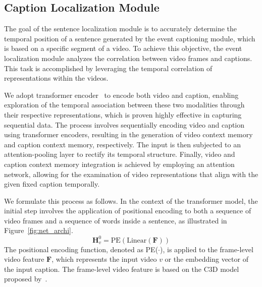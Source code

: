 \subsection{Caption Localization Module}
The goal of the sentence localization module is to accurately determine the temporal position of a sentence generated by the event captioning module, which is based on a specific segment of a video.
To achieve this objective, the event localization module analyzes the correlation between video frames and captions.
This task is accomplished by leveraging the temporal correlation of representations within the videos.

We adopt transformer encoder~\cite{Vaswani2017-sc} to encode both video and caption, enabling exploration of the temporal association between these two modalities through their respective representations, which is proven highly effective in capturing sequential data.
The process involves sequentially encoding video and caption using transformer encoders, resulting in the generation of video context memory and caption context memory, respectively.
The input is then subjected to an attention-pooling layer to rectify its temporal structure.
Finally, video and caption context memory integration is achieved by employing an attention network, allowing for the examination of video representations that align with the given fixed caption temporally.

We formulate this process as follows.
In the context of the transformer model, the initial step involves the application of positional encoding to both a sequence of video frames and a sequence of words inside a sentence, as illustrated in Figure~\ref{fig:net_archi}.
\begin{equation}
    \bm{H}_v^0 = \text{PE} (\text{Linear} \left( \bm{F} \right) )
    \label{eq:linear_transformation}
\end{equation}
The positional encoding function, denoted as PE($\cdot$), is applied to the frame-level video feature $\bm{F}$, which represents the input video $v$ or the embedding vector of the input caption.
The frame-level video feature is based on the C3D model proposed by~\cite{Tran2015-uq}.

